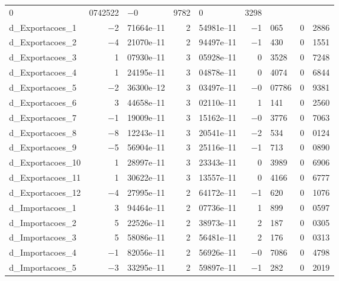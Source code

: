 \documentclass[11pt]{article}
\begin{document}
\begin{center}
\begin{tabular}{lr@{,}lr@{,}lr@{,}lr@{,}l}
    0&0742522 &
      $-$0&9782 &
        0&3298 \\
d\_Exportacoes\_1 &
  $-$2&71664\textrm{e--11} &
    2&54981\textrm{e--11} &
      $-$1&065 &
        0&2886 \\
d\_Exportacoes\_2 &
  $-$4&21070\textrm{e--11} &
    2&94497\textrm{e--11} &
      $-$1&430 &
        0&1551 \\
d\_Exportacoes\_3 &
  1&07930\textrm{e--11} &
    3&05928\textrm{e--11} &
      0&3528 &
        0&7248 \\
d\_Exportacoes\_4 &
  1&24195\textrm{e--11} &
    3&04878\textrm{e--11} &
      0&4074 &
        0&6844 \\
d\_Exportacoes\_5 &
  $-$2&36300\textrm{e--12} &
    3&03497\textrm{e--11} &
      $-$0&07786 &
        0&9381 \\
d\_Exportacoes\_6 &
  3&44658\textrm{e--11} &
    3&02110\textrm{e--11} &
      1&141 &
        0&2560 \\
d\_Exportacoes\_7 &
  $-$1&19009\textrm{e--11} &
    3&15162\textrm{e--11} &
      $-$0&3776 &
        0&7063 \\
d\_Exportacoes\_8 &
  $-$8&12243\textrm{e--11} &
    3&20541\textrm{e--11} &
      $-$2&534 &
        0&0124 \\
d\_Exportacoes\_9 &
  $-$5&56904\textrm{e--11} &
    3&25116\textrm{e--11} &
      $-$1&713 &
        0&0890 \\
d\_Exportacoes\_10 &
  1&28997\textrm{e--11} &
    3&23343\textrm{e--11} &
      0&3989 &
        0&6906 \\
d\_Exportacoes\_11 &
  1&30622\textrm{e--11} &
    3&13557\textrm{e--11} &
      0&4166 &
        0&6777 \\
d\_Exportacoes\_12 &
  $-$4&27995\textrm{e--11} &
    2&64172\textrm{e--11} &
      $-$1&620 &
        0&1076 \\
d\_Importacoes\_1 &
  3&94464\textrm{e--11} &
    2&07736\textrm{e--11} &
      1&899 &
        0&0597 \\
d\_Importacoes\_2 &
  5&22526\textrm{e--11} &
    2&38973\textrm{e--11} &
      2&187 &
        0&0305 \\
d\_Importacoes\_3 &
  5&58086\textrm{e--11} &
    2&56481\textrm{e--11} &
      2&176 &
        0&0313 \\
d\_Importacoes\_4 &
  $-$1&82056\textrm{e--11} &
    2&56926\textrm{e--11} &
      $-$0&7086 &
        0&4798 \\
d\_Importacoes\_5 &
  $-$3&33295\textrm{e--11} &
    2&59897\textrm{e--11} &
      $-$1&282 &
        0&2019 \\

\end{tabular}
\end{center}
\end{document}
